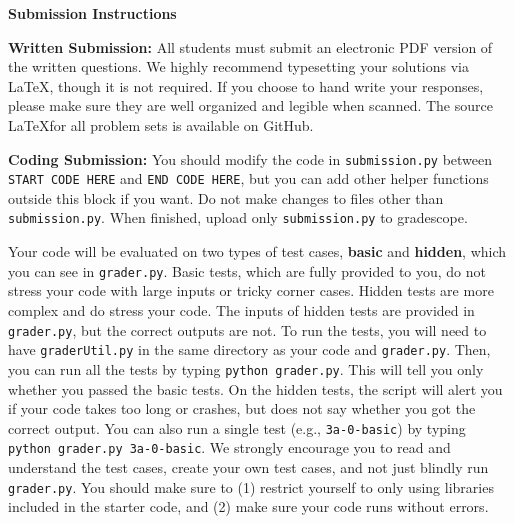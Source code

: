 {\bf Submission Instructions}

{\bf Written Submission:}
All students must submit an electronic PDF version of the written questions. We
highly recommend typesetting your solutions via \LaTeX, though it is not
required. If you choose to hand write your responses, please make sure they are
well organized and legible when scanned. The source \LaTeX for all problem sets
is available on GitHub.

{\bf Coding Submission:}
You should modify the code in {\tt submission.py} between {\tt  START CODE
HERE} and {\tt END CODE HERE}, but you can add other helper functions outside
this block if you want. Do not make changes to files other than
{\tt submission.py}.  When finished, upload only {\tt submission.py} to
gradescope.

Your code will be evaluated on two types of test cases, {\bf basic} and
{\bf hidden}, which you can see in {\tt grader.py}. Basic tests, which are fully
provided to you, do not stress your code with large inputs or tricky corner
cases. Hidden tests are more complex and do stress your code.  The inputs of
hidden tests are provided in {\tt grader.py}, but the correct outputs are not.
To run the tests, you will need to have {\tt graderUtil.py} in the same
directory as your code and {\tt grader.py}. Then, you can run all the tests by
typing {\tt python grader.py}. This will tell you only whether you passed the
basic tests. On the hidden tests, the script will alert you if your code takes
too long or crashes, but does not say whether you got the correct output. You
can also run a single test (e.g., {\tt 3a-0-basic}) by typing {\tt python
grader.py 3a-0-basic}. We strongly encourage you to read and understand the
test cases, create your own test cases, and not just blindly run
{\tt grader.py}. You should make sure to (1) restrict yourself to only using
libraries included in the starter code, and (2) make sure your code runs without
errors.
